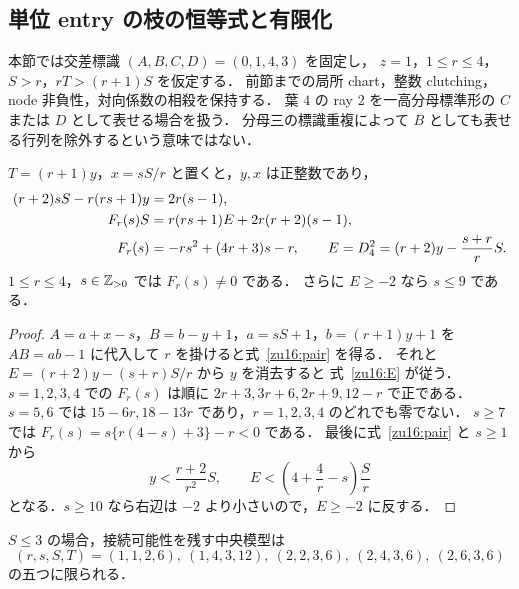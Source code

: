 
\subsection{単位 entry の枝の恒等式と有限化}
\label{zu16:section}

本節では交差標識 $(A,B,C,D)=(0,1,4,3)$ を固定し，
$z=1$，$1\le r\le4$，$S>r$，$rT>(r+1)S$ を仮定する．
前節までの局所 chart，整数 clutching，node 非負性，対向係数の相殺を保持する．
葉 $4$ の ray $2$ を一高分母標準形の $C$ または $D$ として表せる場合を扱う．
分母三の標識重複によって $B$ としても表せる行列を除外するという意味ではない．

\begin{lemma}
\label{zu16:identities}
$T=(r+1)y$，$x=sS/r$ と置くと，$y,x$ は正整数であり，
\begin{align}
 (r+2)sS-r(rs+1)y&=2r(s-1),\label{zu16:pair}\\
 F_r(s)S&=r(rs+1)E+2r(r+2)(s-1),\label{zu16:E}\\
 F_r(s)&=-rs^2+(4r+3)s-r,\qquad
 E=D^2_4=(r+2)y-\frac{s+r}{r}S.\notag
\end{align}
$1\le r\le4$，$s\in\mathbb Z_{>0}$ では $F_r(s)\ne0$ である．
さらに $E\ge-2$ なら $s\le9$ である．
\end{lemma}

\begin{proof}
$A=a+x-s$，$B=b-y+1$，$a=sS+1$，$b=(r+1)y+1$ を
$AB=ab-1$ に代入して $r$ を掛けると式~\eqref{zu16:pair} を得る．
それと $E=(r+2)y-(s+r)S/r$ から $y$ を消去すると
式~\eqref{zu16:E} が従う．
$s=1,2,3,4$ での $F_r(s)$ は順に
$2r+3,3r+6,2r+9,12-r$ で正である．
$s=5,6$ では $15-6r,18-13r$ であり，$r=1,2,3,4$ のどれでも零でない．
$s\ge7$ では $F_r(s)=s\{r(4-s)+3\}-r<0$ である．
最後に式~\eqref{zu16:pair} と $s\ge1$ から
\[
 y<\frac{r+2}{r^2}S,\qquad
 E<\left(4+\frac4r-s\right)\frac Sr
\]
となる．$s\ge10$ なら右辺は $-2$ より小さいので，$E\ge-2$ に反する．
\end{proof}

\begin{lemma}
\label{zu16:small-S}
$S\le3$ の場合，接続可能性を残す中央模型は
\[
 (r,s,S,T)=(1,1,2,6),\ (1,4,3,12),\
 (2,2,3,6),\ (2,4,3,6),\ (2,6,3,6)
\]
の五つに限られる．
\end{lemma}

